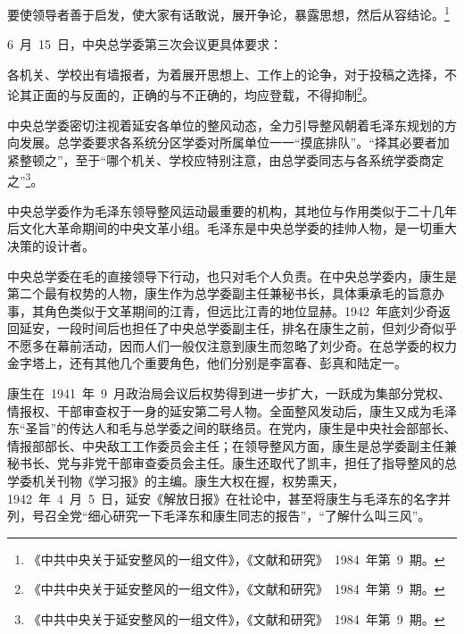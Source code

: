 \begin{quoting}
要使领导者善于启发，使大家有话敢说，展开争论，暴露思想，然后从容结论。\footnote{《中共中央关于延安整风的一组文件》，《文献和研究》~1984~年第~9~期。}
\end{quoting}6~月~15~日，中央总学委第三次会议更具体要求：

\begin{quoting}
各机关、学校出有墙报者，为着展开思想上、工作上的论争，对于投稿之选择，不论其正面的与反面的，正确的与不正确的，均应登载，不得抑制\footnote{《中共中央关于延安整风的一组文件》，《文献和研究》~1984~年第~9~期。}。
\end{quoting}中央总学委密切注视着延安各单位的整风动态，全力引导整风朝着毛泽东规划的方向发展。总学委要求各系统分区学委对所属单位一一“摸底排队”。“择其必要者加紧整顿之”，至于“哪个机关、学校应特别注意，由总学委同志与各系统学委商定之”\footnote{《中共中央关于延安整风的一组文件》，《文献和研究》~1984~年第~9~期。}。

中央总学委作为毛泽东领导整风运动最重要的机构，其地位与作用类似于二十几年后文化大革命期间的中央文革小组。毛泽东是中央总学委的挂帅人物，是一切重大决策的设计者。

中央总学委在毛的直接领导下行动，也只对毛个人负责。在中央总学委内，康生是第二个最有权势的人物，康生作为总学委副主任兼秘书长，具体秉承毛的旨意办事，其角色类似于文革期间的江青，但远比江青的地位显赫。1942~年底刘少奇返回延安，一段时间后也担任了中央总学委副主任，排名在康生之前，但刘少奇似乎不愿多在幕前活动，因而人们一般仅注意到康生而忽略了刘少奇。在总学委的权力金字塔上，还有其他几个重要角色，他们分别是李富春、彭真和陆定一。

康生在~1941~年~9~月政治局会议后权势得到进一步扩大，一跃成为集部分党权、情报权、干部审查权于一身的延安第二号人物。全面整风发动后，康生又成为毛泽东“圣旨”的传达人和毛与总学委之间的联络员。在党内，康生是中央社会部部长、情报部部长、中央敌工工作委员会主任；在领导整风方面，康生是总学委副主任兼秘书长、党与非党干部审查委员会主任。康生还取代了凯丰，担任了指导整风的总学委机关刊物《学习报》的主编。康生大权在握，权势熏天，1942~年~4~月~5~日，延安《解放日报》在社论中，甚至将康生与毛泽东的名字并列，号召全党“细心研究一下毛泽东和康生同志的报告”，“了解什么叫三风”。

